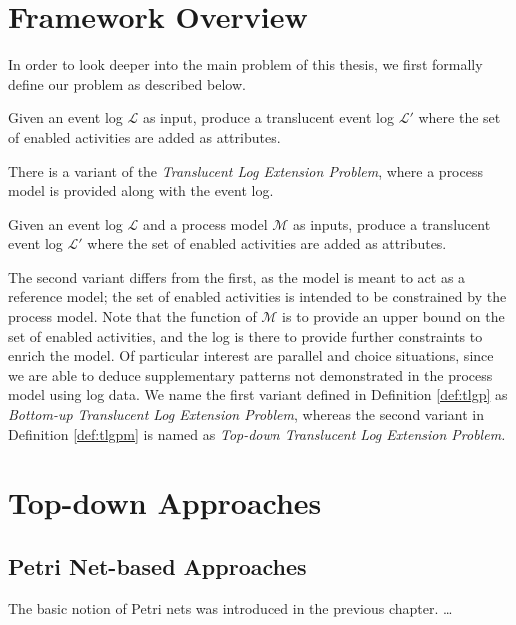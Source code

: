 \section{Framework Overview}
In order to look deeper into the main problem of this thesis, we first formally define our problem as described below.

\begin{definition}
\label{def:tlgp}
    Given an event log $\mathcal{L}$ as input, produce a translucent event log $\mathcal{L'}$ where the set of enabled activities are added as attributes. 
\end{definition}

There is a variant of the \emph{Translucent Log Extension Problem}, where a process model is provided along with the event log.

\begin{definition}
\label{def:tlgpm}
    Given an event log $\mathcal{L}$ and a process model $\mathcal{M}$ as inputs, produce a translucent event log $\mathcal{L'}$ where the set of enabled activities are added as attributes. 
\end{definition}

The second variant differs from the first, as the model is meant to act as a reference model; the set of enabled activities is intended to be constrained by the process model. Note that the function of $\mathcal{M}$ is to provide an upper bound on the set of enabled activities, and the log is there to provide further constraints to enrich the model. Of particular interest are parallel and choice situations, since we are able to deduce supplementary patterns not demonstrated in the process model using log data. We name the first variant defined in Definition \ref{def:tlgp} as \emph{Bottom-up Translucent Log Extension Problem}, whereas the second variant in Definition \ref{def:tlgpm} is named as \emph{Top-down Translucent Log Extension Problem.}

\section{Top-down Approaches}

\subsection{Petri Net-based Approaches}

The basic notion of Petri nets was introduced in the previous chapter. \dots

